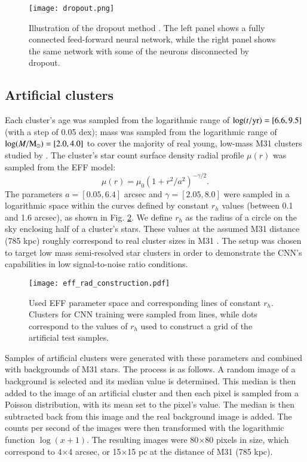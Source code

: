 \documentclass{aa}
\begin{document}
\begin{figure}
    \centering
        \texttt{[image: dropout.png]}
    \caption{Illustration of the dropout method \citep{dropout}. The left panel shows a fully connected feed-forward neural network, while the right panel shows the same network with some of the neurons disconnected by dropout.}
    \label{fig:dropout_illustration}
\end{figure}

\subsection{Artificial clusters} \label{artificial_clusters}
Each cluster's age was sampled from the logarithmic range of $\log(t/{\rm yr})=[6.6, 9.5]$ (with a step of 0.05 dex); mass was sampled from the logarithmic range of $\log(M/{\rm M_\odot})=[2.0, 4.0]$ to cover the majority of real young, low-mass M31 clusters studied by \cite{2017A&A...602A.112D}. The cluster's star count surface density radial profile $\mu(r)$ was sampled from the EFF \citep{1987ApJ...323...54E} model:
\begin{equation}
\mu(r)=\mu_0(1+r^2/a^2)^{-\gamma/2}.
\end{equation}
The parameters $a=[0.05, 6.4]$ arcsec and $\gamma=[2.05, 8.0]$ were sampled in a logarithmic space within the curves defined by constant $r_h$ values (between 0.1 and 1.6 arcsec), as shown in Fig. \ref{fig:eff_rad_construction}. We define $r_h$ as the radius of a circle on the sky enclosing half of a cluster's stars. These values at the assumed M31 distance (785 kpc) roughly correspond to real cluster sizes in M31 \citep{2009ApJ...703.1872V,2014A&A...569A..30N}. The setup was chosen to target low mass semi-resolved star clusters in order to demonstrate the CNN's capabilities in low signal-to-noise ratio conditions.

\begin{figure}
    \centering
    \texttt{[image: eff\_rad\_construction.pdf]}
    \caption{Used EFF parameter space and corresponding lines of constant $r_h$. Clusters for CNN training were sampled from lines, while dots correspond to the values of $r_h$ used to construct a grid of the artificial test samples.}
    \label{fig:eff_rad_construction}
\end{figure}

Samples of artificial clusters were generated with these parameters and combined with backgrounds of M31 stars. The process is as follows. A random image of a background is selected and its median value is determined. This median is then added to the image of an artificial cluster and then each pixel is sampled from a Poisson distribution, with its mean set to the pixel's value. The median is then subtracted back from this image and the real background image is added. The counts per second of the images were then transformed with the logarithmic function $\log(x + 1)$. The resulting images were 80$\times$80 pixels in size, which correspond to 4$\times$4 arcsec, or 15$\times$15 pc at the distance of M31 (785 kpc).
\end{document}
